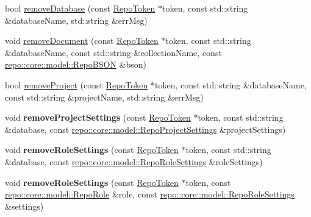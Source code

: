 \begin{DoxyCompactItemize}
\item 
bool \hyperlink{class_repo_controller_1_1___repo_controller_impl_a937aee3f9eb3a6626a35bbc4dcb313e3}{remove\+Database} (const \hyperlink{class_repo_controller_1_1_repo_token}{Repo\+Token} $\ast$token, const std\+::string \&database\+Name, std\+::string \&err\+Msg)
\item 
void \hyperlink{class_repo_controller_1_1___repo_controller_impl_a80dd49411609a80ae46cca65590fa23c}{remove\+Document} (const \hyperlink{class_repo_controller_1_1_repo_token}{Repo\+Token} $\ast$token, const std\+::string \&database\+Name, const std\+::string \&collection\+Name, const \hyperlink{classrepo_1_1core_1_1model_1_1_repo_b_s_o_n}{repo\+::core\+::model\+::\+Repo\+B\+S\+O\+N} \&bson)
\item 
bool \hyperlink{class_repo_controller_1_1___repo_controller_impl_aaff4d27ebe95d777d2a4145e78806e2f}{remove\+Project} (const \hyperlink{class_repo_controller_1_1_repo_token}{Repo\+Token} $\ast$token, const std\+::string \&database\+Name, const std\+::string \&project\+Name, std\+::string \&err\+Msg)
\item 
\hypertarget{class_repo_controller_1_1___repo_controller_impl_a7b305d0eb964ff4f464b3eb05986c82f}{}void {\bfseries remove\+Project\+Settings} (const \hyperlink{class_repo_controller_1_1_repo_token}{Repo\+Token} $\ast$token, const std\+::string \&database, const \hyperlink{classrepo_1_1core_1_1model_1_1_repo_project_settings}{repo\+::core\+::model\+::\+Repo\+Project\+Settings} \&project\+Settings)\label{class_repo_controller_1_1___repo_controller_impl_a7b305d0eb964ff4f464b3eb05986c82f}

\item 
\hypertarget{class_repo_controller_1_1___repo_controller_impl_a31049396ed80a8a07ee06d17c9c6eb9a}{}void {\bfseries remove\+Role\+Settings} (const \hyperlink{class_repo_controller_1_1_repo_token}{Repo\+Token} $\ast$token, const std\+::string \&database, const \hyperlink{classrepo_1_1core_1_1model_1_1_repo_role_settings}{repo\+::core\+::model\+::\+Repo\+Role\+Settings} \&role\+Settings)\label{class_repo_controller_1_1___repo_controller_impl_a31049396ed80a8a07ee06d17c9c6eb9a}

\item 
\hypertarget{class_repo_controller_1_1___repo_controller_impl_acd09f7f74c1fbee18e23684416c63adb}{}void {\bfseries remove\+Role\+Settings} (const \hyperlink{class_repo_controller_1_1_repo_token}{Repo\+Token} $\ast$token, const \hyperlink{classrepo_1_1core_1_1model_1_1_repo_role}{repo\+::core\+::model\+::\+Repo\+Role} \&role, const \hyperlink{classrepo_1_1core_1_1model_1_1_repo_role_settings}{repo\+::core\+::model\+::\+Repo\+Role\+Settings} \&settings)\label{class_repo_controller_1_1___repo_controller_impl_acd09f7f74c1fbee18e23684416c63adb}


\end{DoxyCompactItemize}
